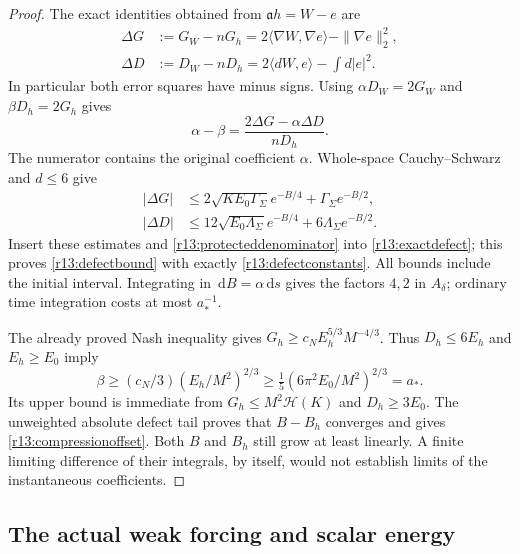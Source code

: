 \documentclass[11pt]{article}
\numberwithin{equation}{section}
\newcommand{\dd}{\,\mathrm d}
\begin{document}
\begin{proof}
The exact identities obtained from $\mathfrak ah=W-e$ are
\begin{align}
 \Delta G&:=G_W-nG_h
       =2\langle\nabla W,\nabla e\rangle-\|\nabla e\|_2^2,
 \nonumber\\
 \Delta D&:=D_W-nD_h
       =2\langle dW,e\rangle-\int d|e|^2.
 \label{r13:exactdifferences}
\end{align}
In particular both error squares have minus signs. Using
$\alpha D_W=2G_W$ and $\beta D_h=2G_h$ gives
\begin{equation}\label{r13:exactdefect}
 \alpha-\beta=\frac{2\Delta G-\alpha\Delta D}{nD_h}.
\end{equation}
The numerator contains the original coefficient $\alpha$.
Whole-space Cauchy--Schwarz and $d\le6$ give
\begin{align*}
 |\Delta G|&\le2\sqrt{KE_0\Gamma_\Sigma}e^{-B/4}
                                  +\Gamma_\Sigma e^{-B/2},\\
 |\Delta D|&\le12\sqrt{E_0\Lambda_\Sigma}e^{-B/4}
                                  +6\Lambda_\Sigma e^{-B/2}.
\end{align*}
Insert these estimates and \eqref{r13:protecteddenominator} into
\eqref{r13:exactdefect}; this proves
\eqref{r13:defectbound} with exactly \eqref{r13:defectconstants}.
All bounds include the initial interval. Integrating in
$\dd B=\alpha\dd s$ gives the factors $4,2$ in $A_\delta$;
ordinary time integration costs at most $a_*^{-1}$.

The already proved Nash inequality gives
$G_h\ge c_NE_h^{5/3}M^{-4/3}$. Thus $D_h\le6E_h$ and $E_h\ge E_0$
imply
\[
 \beta\ge(c_N/3)(E_h/M^2)^{2/3}
       \ge\tfrac15(6\pi^2E_0/M^2)^{2/3}=a_*.
\]
Its upper bound is immediate from $G_h\le M^2\mathcal H(K)$ and
$D_h\ge3E_0$. The unweighted absolute defect tail proves that
$B-B_h$ converges and gives \eqref{r13:compressionoffset}.
Both $B$ and $B_h$ still grow at least linearly. A finite limiting
difference of their integrals, by itself, would not establish limits
of the instantaneous coefficients.
\end{proof}

\subsection{The actual weak forcing and scalar energy}
\end{document}
